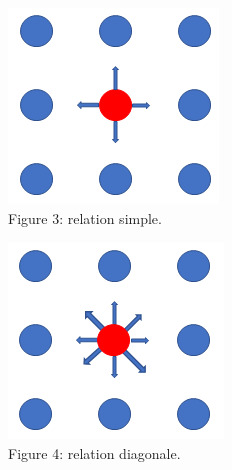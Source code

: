 \documentclass[a4paper]{article}
\begin{document}
\begin{figure}
  \centering
  \begin{minipage}{.5\textwidth}
    \centering
    \includegraphics[width=.4\linewidth]{1.png}{\\Figure 3: relation simple.}
    \label{fig:test1}
  \end{minipage}%
  \begin{minipage}{.5\textwidth}
    \centering
    \includegraphics[width=.4\linewidth]{2.png}{\\Figure 4: relation diagonale.}
    \label{fig:test2}
  \end{minipage}
  \end{figure}
\end{document}
